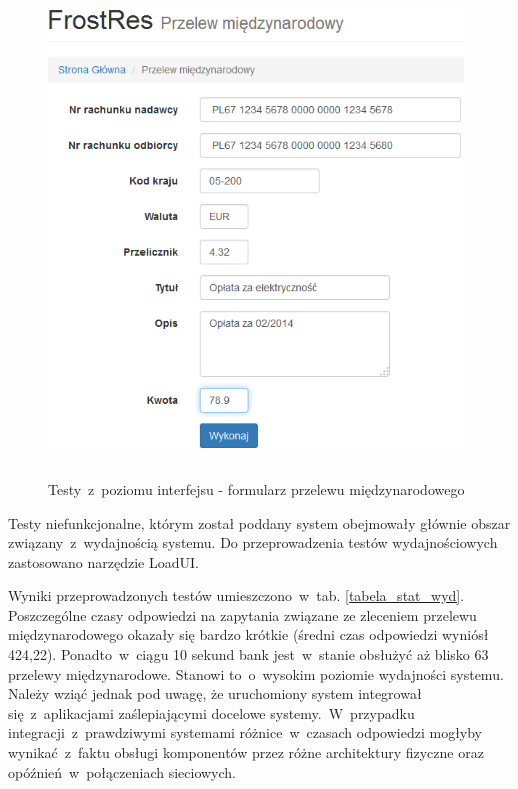 \begin{figure}[h!tbp]
\begin{centering}
\includegraphics[width=11cm, height=13cm]{img/przelew_wypelniony_form.png}
\caption[Testy~z~poziomu interfejsu - formularz przelewu międzynarodowego]{Testy~z~poziomu interfejsu - formularz przelewu międzynarodowego}\label{test_funk_interfejs}
\end{centering}
\end{figure}


Testy niefunkcjonalne, którym został poddany system obejmowały głównie obszar związany~z~wydajnością systemu. Do przeprowadzenia testów wydajnościowych zastosowano narzędzie LoadUI. 

Wyniki przeprowadzonych testów umieszczono~w~tab. \ref{tabela_stat_wyd}. Poszczególne czasy odpowiedzi na zapytania związane ze zleceniem przelewu międzynarodowego okazały się bardzo krótkie (średni czas odpowiedzi wyniósł 424,22). Ponadto~w~ciągu 10 sekund bank jest~w~stanie obsłużyć aż blisko 63 przelewy międzynarodowe. Stanowi to~o~wysokim poziomie wydajności systemu. Należy wziąć jednak pod uwagę, że uruchomiony system integrował się~z~aplikacjami zaślepiającymi docelowe systemy.~W~przypadku integracji~z~prawdziwymi systemami różnice~w~czasach odpowiedzi mogłyby wynikać~z~faktu obsługi komponentów przez różne architektury fizyczne oraz opóźnień~w~połączeniach sieciowych.

